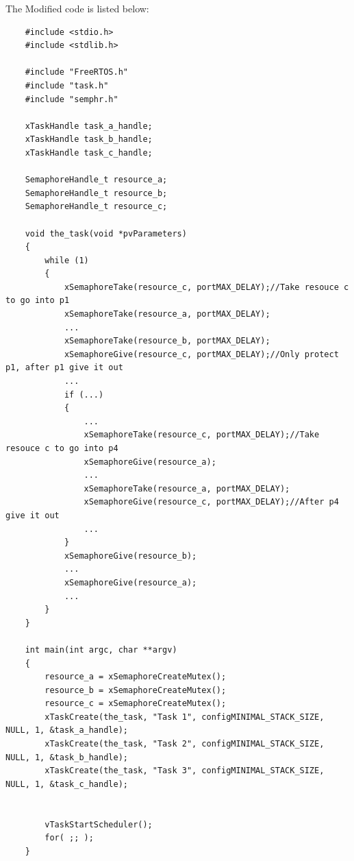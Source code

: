 The Modified code is listed below:

\begin{lstlisting}
    #include <stdio.h>
    #include <stdlib.h>
    
    #include "FreeRTOS.h"
    #include "task.h"
    #include "semphr.h"
    
    xTaskHandle task_a_handle;
    xTaskHandle task_b_handle;
    xTaskHandle task_c_handle;
    
    SemaphoreHandle_t resource_a;
    SemaphoreHandle_t resource_b;
    SemaphoreHandle_t resource_c;
    
    void the_task(void *pvParameters)
    {
        while (1)
        {
            xSemaphoreTake(resource_c, portMAX_DELAY);//Take resouce c to go into p1
            xSemaphoreTake(resource_a, portMAX_DELAY);
            ...
            xSemaphoreTake(resource_b, portMAX_DELAY);
            xSemaphoreGive(resource_c, portMAX_DELAY);//Only protect p1, after p1 give it out
            ...
            if (...)
            {
                ...
                xSemaphoreTake(resource_c, portMAX_DELAY);//Take resouce c to go into p4
                xSemaphoreGive(resource_a);
                ...
                xSemaphoreTake(resource_a, portMAX_DELAY);
                xSemaphoreGive(resource_c, portMAX_DELAY);//After p4 give it out
                ...
            }
            xSemaphoreGive(resource_b);
            ...
            xSemaphoreGive(resource_a);
            ...
        }
    }
    
    int main(int argc, char **argv)
    {
        resource_a = xSemaphoreCreateMutex();
        resource_b = xSemaphoreCreateMutex();
        resource_c = xSemaphoreCreateMutex();
        xTaskCreate(the_task, "Task 1", configMINIMAL_STACK_SIZE, NULL, 1, &task_a_handle);
        xTaskCreate(the_task, "Task 2", configMINIMAL_STACK_SIZE, NULL, 1, &task_b_handle);
        xTaskCreate(the_task, "Task 3", configMINIMAL_STACK_SIZE, NULL, 1, &task_c_handle);
        
    
        vTaskStartScheduler();
        for( ;; );
    }
    
    
\end{lstlisting}

